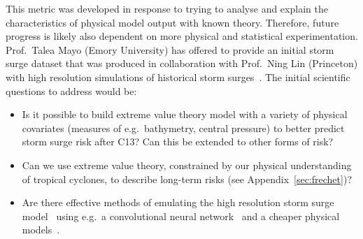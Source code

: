 \documentclass[usenames, dvipsnames]{article}      %
\begin{document}
This metric was developed 
in response to trying to analyse and explain the 
characteristics of physical model output with known theory.
Therefore, future progress is likely also dependent 
on more physical and statistical experimentation.
Prof.~Talea Mayo (Emory University) has offered to provide
an initial storm surge dataset that was produced in
collaboration with Prof.~Ning Lin (Princeton) with high resolution simulations 
of historical storm surges~\cite{Marsooli2019ClimatePatterns, Marsooli2018NumericalCoasts, Lin2015GreyCyclones}. 
The initial scientific questions to address would be:
\begin{itemize}
\addtolength\itemsep{-3mm}

\iftrue
    \item Is it possible to build extreme value theory model
        with a variety of physical covariates 
        (measures of e.g.~bathymetry, central pressure)
        to better predict storm surge risk after C13? 
        Can this be extended to other forms of risk?
        
    \item Can we use extreme value theory, constrained by our physical
        understanding of tropical cyclones, to describe long-term risks 
        (see Appendix~\ref{sec:frechet})?
        
\fi

    \item Are there effective methods of 
        emulating the high resolution storm 
        surge model~\cite{Ma2020MultifidelitySurge} 
        using e.g.~a convolutional neural
        network~\cite{Ronneberger2015U-Net:Segmentation,
        beucler2019achieving, beucler2019achieving} 
        and a cheaper physical 
        models~\cite{Akbar2013HybridModeling}.
        
        \vspace{-10pt}
\end{itemize}
\end{document}
